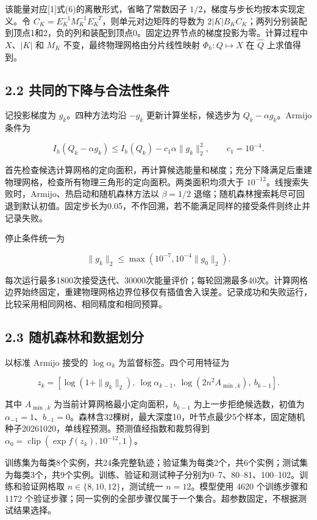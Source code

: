 \documentclass[UTF8,a4paper,zihao=5,fontset=fandol]{ctexart}
\begin{document}
该能量对应[1]式(6)的离散形式，省略了常数因子 $1/2$，梯度与步长均按本实现定义。令 $C_K=E_K^{-1}M_K^{-1}E_K^{-T}$，则单元对边矩阵的导数为 $2|K|B_KC_K$；两列分别装配到顶点1和2，负的列和装配到顶点0。固定边界节点的梯度投影为零。计算过程中 $X$、$|K|$ 和 $M_K$ 不变，最终物理网格由分片线性映射 $\Phi_h:Q\mapsto X$ 在 $\widehat Q$ 上求值得到。


\newpage

\subsection*{2.2 共同的下降与合法性条件}

记投影梯度为 $g_k$。四种方法均沿 $-g_k$ 更新计算坐标，候选步为 $Q_k-\alpha g_k$。Armijo 条件为


\[
I_h(Q_k-\alpha g_k)\le I_h(Q_k)-c_1\alpha\|g_k\|_2^2,\qquad c_1=10^{-4}.
\]

首先检查候选计算网格的定向面积，再计算候选能量和梯度；充分下降满足后重建物理网格，检查所有物理三角形的定向面积。两类面积均须大于 $10^{-12}$。线搜索失败时，Armijo、热启动和随机森林方法以 $\beta=1/2$ 退缩；随机森林搜索耗尽可回退到默认初值。固定步长为0.05，不作回溯，若不能满足同样的接受条件则终止并记录失败。


停止条件统一为


\[
\|g_k\|_2\le\max(10^{-7},10^{-4}\|g_0\|_2).
\]

每次运行最多1800次接受迭代、30000次能量评价；每轮回溯最多40次。计算网格边界始终固定，重建物理网格边界位移仅有插值舍入误差。记录成功和失败运行，比较采用相同网格、相同精度和相同预算。


\subsection*{2.3 随机森林和数据划分}

以标准 Armijo 接受的 $\log\alpha_k$ 为监督标签。四个可用特征为


\[
z_k=\left[\log(1+\|g_k\|_2),\ \log\alpha_{k-1},\ \log(2n^2 A_{\min,k}),\ b_{k-1}\right].
\]

其中 $A_{\min,k}$ 为当前计算网格最小定向面积，$b_{k-1}$ 为上一步拒绝候选数，初值为 $\alpha_{-1}=1$、$b_{-1}=0$。森林含32棵树，最大深度10，叶节点最少5个样本，固定随机种子20261020，单线程预测。预测值经指数和裁剪得到 $\alpha_0=\operatorname{clip}(\exp f(z_k),10^{-12},1)$。


训练集为每类8个实例，共24条完整轨迹；验证集为每类2个，共6个实例；测试集为每类3个，共9个实例。训练、验证和测试种子分别为0–7、80–81、100–102。训练和验证网格取 $n\in\{8,10,12\}$，测试统一 $n=12$。模型使用 4620 个训练步骤和 1172 个验证步骤；同一实例的全部步骤仅属于一个集合。超参数固定，不根据测试结果选择。
\end{document}
